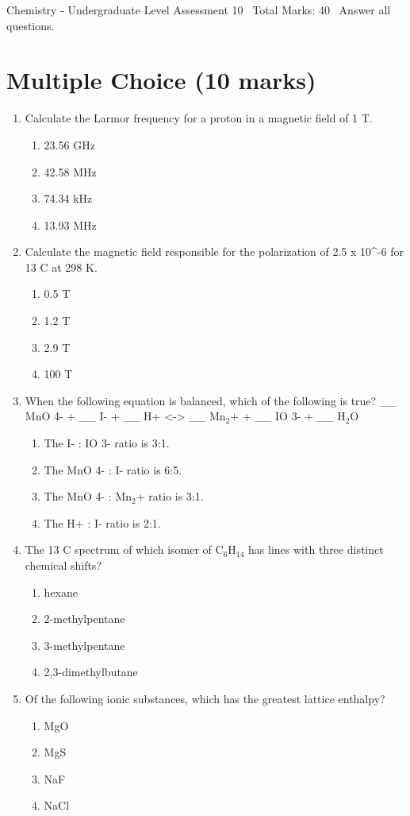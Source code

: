 \documentclass[12pt]{article}
\begin{document}
\begin{center}
Chemistry - Undergraduate Level Assessment 10 \
Total Marks: 40 \
Answer all questions.
\end{center}

\section*{Multiple Choice (10 marks)}
\begin{enumerate}[label=\arabic*.]
\item Calculate the Larmor frequency for a proton in a magnetic field of 1 T.
\begin{enumerate}[label=(\alph*)]
    \item 23.56 GHz
    \item 42.58 MHz
    \item 74.34 kHz
    \item 13.93 MHz
\end{enumerate}
\item Calculate the magnetic field responsible for the polarization of 2.5 x 10^-6 for 13 C at 298 K.
\begin{enumerate}[label=(\alph*)]
    \item 0.5 T
    \item 1.2 T
    \item 2.9 T
    \item 100 T
\end{enumerate}
\item When the following equation is balanced, which of the following is true? \_\_ MnO 4- + \_\_ I- + \_\_ H+ \textless{}-\textgreater{} \_\_ Mn$_{2}$+ + \_\_ IO 3- + \_\_ H$_{2}$O
\begin{enumerate}[label=(\alph*)]
    \item The I- : IO 3- ratio is 3:1.
    \item The MnO 4- : I- ratio is 6:5.
    \item The MnO 4- : Mn$_{2}$+ ratio is 3:1.
    \item The H+ : I- ratio is 2:1.
\end{enumerate}
\item The 13 C spectrum of which isomer of C$_{6}$H$_{14}$ has lines with three distinct chemical shifts?
\begin{enumerate}[label=(\alph*)]
    \item hexane
    \item 2-methylpentane
    \item 3-methylpentane
    \item 2,3-dimethylbutane
\end{enumerate}
\item Of the following ionic substances, which has the greatest lattice enthalpy?
\begin{enumerate}[label=(\alph*)]
    \item MgO
    \item MgS
    \item NaF
    \item NaCl
\end{enumerate}
\end{enumerate}
\end{document}
